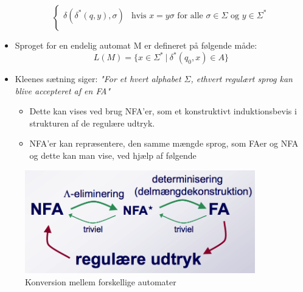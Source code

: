 \documentclass[a4, danish]{article}
\begin{document}
\begin{itemize}
\begin{equation*}
\begin{cases}
			\mbox{$\delta(\delta^*(q,y),\sigma)$} & \mbox{hvis $x=y\sigma$ for alle $\sigma \in \Sigma$ og $y\in \Sigma^*$} \\
		\end{cases}
		\end{equation*}
    \item Sproget for en endelig automat M er defineret på følgende måde:
    \begin{equation*}
      L(M)=\{x \in \Sigma^* \ | \ \delta^*(q_0,x)\in A \}
    \end{equation*}
    \item Kleenes sætning siger: \textit{"For et hvert alphabet $\Sigma$, ethvert regulært sprog kan blive accepteret af en FA"}
    \begin{itemize}
    	\item Dette kan vises ved brug NFA'er, som et konstruktivt induktionsbevis i strukturen af de regulære udtryk.
      \item NFA'er kan repræsentere, den samme mængde sprog, som FAer og NFA og dette kan man vise, ved hjælp af følgende 
    \end{itemize}
  \end{itemize}
  \begin{figure}[ht!]
  	  \centering
  	  \includegraphics[width=100mm]{img/automater}
  	  \caption{Konversion mellem forskellige automater	\label{automater1}}
    \end{figure}
\end{document}

